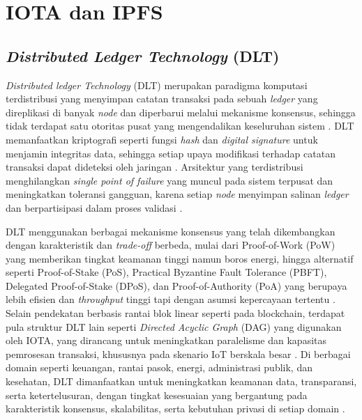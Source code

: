\section{IOTA dan IPFS}\label{subsec:studi-literatur-dlt-iota-ipfs}

\subsection{\textit{Distributed \textit{Ledger} Technology} (DLT)}

\textit{Distributed \textit{ledger} Technology} (DLT) merupakan paradigma komputasi terdistribusi yang menyimpan catatan transaksi pada sebuah \textit{ledger} yang direplikasi di banyak \textit{node} dan diperbarui melalui mekanisme konsensus, sehingga tidak terdapat satu otoritas pusat yang mengendalikan keseluruhan sistem \parencite{Savadatti_2025_dlt_overview}.
DLT memanfaatkan kriptografi seperti fungsi \textit{hash} dan \textit{digital signature} untuk menjamin integritas data, sehingga setiap upaya modifikasi terhadap catatan transaksi dapat dideteksi oleh jaringan \parencite{Savadatti_2025_dlt_overview}.
Arsitektur yang terdistribusi menghilangkan \textit{single point of failure} yang muncul pada sistem terpusat dan meningkatkan toleransi gangguan, karena setiap \textit{node} menyimpan salinan \textit{ledger} dan berpartisipasi dalam proses validasi \parencite{Savadatti_2025_dlt_overview}.

DLT menggunakan berbagai mekanisme konsensus yang telah dikembangkan dengan karakteristik dan \textit{trade-off} berbeda, mulai dari Proof-of-Work (PoW) yang memberikan tingkat keamanan tinggi namun boros energi, hingga alternatif seperti Proof-of-Stake (PoS), Practical Byzantine Fault Tolerance (PBFT), Delegated Proof-of-Stake (DPoS), dan Proof-of-Authority (PoA) yang berupaya lebih efisien dan \textit{throughput} tinggi tapi dengan asumsi kepercayaan tertentu \parencite{Savadatti_2025_dlt_overview}.
Selain pendekatan berbasis rantai blok linear seperti pada blockchain, terdapat pula struktur DLT lain seperti \textit{Directed Acyclic Graph} (DAG) yang digunakan oleh IOTA, yang dirancang untuk meningkatkan paralelisme dan kapasitas pemrosesan transaksi, khususnya pada skenario IoT berskala besar \parencite{Savadatti_2025_dlt_overview}.
Di berbagai domain seperti keuangan, rantai pasok, energi, administrasi publik, dan kesehatan, DLT dimanfaatkan untuk meningkatkan keamanan data, transparansi, serta ketertelusuran, dengan tingkat kesesuaian yang bergantung pada karakteristik konsensus, skalabilitas, serta kebutuhan privasi di setiap domain \parencite{Savadatti_2025_dlt_overview}.

